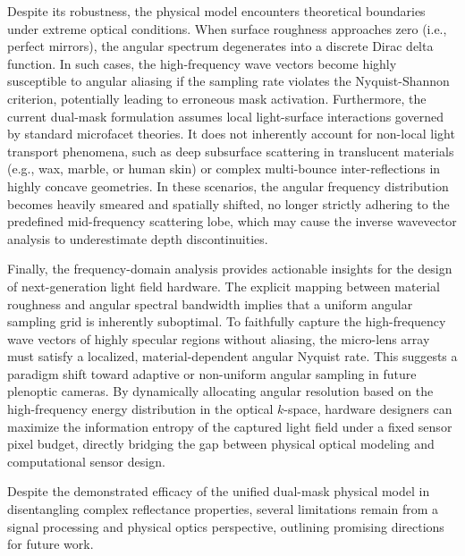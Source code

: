 \documentclass[lettersize,journal]{IEEEtran}
\begin{document}
Despite its robustness, the physical model encounters theoretical boundaries under extreme optical conditions. When surface roughness approaches zero (i.e., perfect mirrors), the angular spectrum degenerates into a discrete Dirac delta function. In such cases, the high-frequency wave vectors become highly susceptible to angular aliasing if the sampling rate violates the Nyquist-Shannon criterion, potentially leading to erroneous mask activation. Furthermore, the current dual-mask formulation assumes local light-surface interactions governed by standard microfacet theories. It does not inherently account for non-local light transport phenomena, such as deep subsurface scattering in translucent materials (e.g., wax, marble, or human skin) or complex multi-bounce inter-reflections in highly concave geometries. In these scenarios, the angular frequency distribution becomes heavily smeared and spatially shifted, no longer strictly adhering to the predefined mid-frequency scattering lobe, which may cause the inverse wavevector analysis to underestimate depth discontinuities.

Finally, the frequency-domain analysis provides actionable insights for the design of next-generation light field hardware. The explicit mapping between material roughness and angular spectral bandwidth implies that a uniform angular sampling grid is inherently suboptimal. To faithfully capture the high-frequency wave vectors of highly specular regions without aliasing, the micro-lens array must satisfy a localized, material-dependent angular Nyquist rate. This suggests a paradigm shift toward adaptive or non-uniform angular sampling in future plenoptic cameras. By dynamically allocating angular resolution based on the high-frequency energy distribution in the optical $k$-space, hardware designers can maximize the information entropy of the captured light field under a fixed sensor pixel budget, directly bridging the gap between physical optical modeling and computational sensor design.

Despite the demonstrated efficacy of the unified dual-mask physical model in disentangling complex reflectance properties, several limitations remain from a signal processing and physical optics perspective, outlining promising directions for future work.
\end{document}
